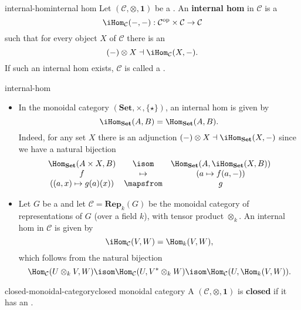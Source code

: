 \begin{topic}{internal-hom}{internal hom}
    Let $(\mathcal{C}, \otimes, \textbf{1})$ be a  . An \textbf{internal hom} in $\mathcal{C}$ is a 
    \[ \iHom_\mathcal{C}(-, -) : \mathcal{C}^\textup{op} \times \mathcal{C} \to \mathcal{C} \]
    such that for every object $X$ of $\mathcal{C}$ there is an 
    \[ (-) \otimes X \dashv \iHom_\mathcal{C}(X, -) . \]
    If such an internal hom exists, $\mathcal{C}$ is called a .
\end{topic}

\begin{example}{internal-hom}
    \begin{itemize}
        \item In the monoidal category $(\textbf{Set}, \times, \{ \star \})$, an internal hom is given by
        \[ \iHom_\textbf{Set}(A, B) = \Hom_\textbf{Set}(A, B) . \]
        Indeed, for any set $X$ there is an adjunction $(-) \otimes X \dashv \iHom_\textbf{Set}(X, -)$ since we have a natural bijection
        \[ \begin{array}{ccc}
            \Hom_\textbf{Set}(A \times X, B) & \isom & \Hom_\textbf{Set}(A, \iHom_\textbf{Set}(X, B)) \\
            f & \mapsto & (a \mapsto f(a, -)) \\
            ((a, x) \mapsto g(a)(x)) & \mapsfrom & g
        \end{array} \]
        \item Let $G$ be a  and let $\mathcal{C} = \textbf{Rep}_k(G)$ be the monoidal category of representations of $G$ (over a field $k$), with tensor product $\otimes_k$. An internal hom in $\mathcal{C}$ is given by
        \[ \iHom_\mathcal{C}(V, W) = \Hom_{k}(V, W) , \]
        which follows from the natural bijection
        \[ \Hom_\mathcal{C}(U \otimes_k V, W) \isom \Hom_\mathcal{C}(U, V^* \otimes_k W) \isom \Hom_\mathcal{C}(U, \Hom_k(V, W)) . \]
    \end{itemize}
\end{example}

\begin{topic}{closed-monoidal-category}{closed monoidal category}
    A   $(\mathcal{C}, \otimes, \textbf{1})$ is \textbf{closed} if it has an .
\end{topic}

